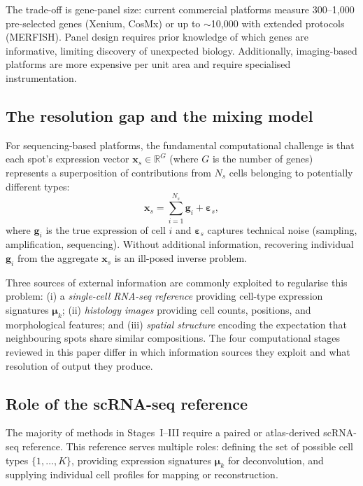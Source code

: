 The trade-off is gene-panel size: current commercial platforms measure 300--1{,}000 pre-selected genes (Xenium, CosMx) or up to $\sim$10{,}000 with extended protocols (MERFISH). Panel design requires prior knowledge of which genes are informative, limiting discovery of unexpected biology. Additionally, imaging-based platforms are more expensive per unit area and require specialised instrumentation.

\subsection{The resolution gap and the mixing model}

For sequencing-based platforms, the fundamental computational challenge is that each spot's expression vector $\mathbf{x}_s \in \mathbb{R}^G$ (where $G$ is the number of genes) represents a superposition of contributions from $N_s$ cells belonging to potentially different types:
\begin{equation}
  \mathbf{x}_s = \sum_{i=1}^{N_s} \mathbf{g}_i + \boldsymbol{\varepsilon}_s,
  \label{eq:mixing}
\end{equation}
where $\mathbf{g}_i$ is the true expression of cell $i$ and $\boldsymbol{\varepsilon}_s$ captures technical noise (sampling, amplification, sequencing). Without additional information, recovering individual $\mathbf{g}_i$ from the aggregate $\mathbf{x}_s$ is an ill-posed inverse problem.

Three sources of external information are commonly exploited to regularise this problem: (i) a \emph{single-cell RNA-seq reference} providing cell-type expression signatures $\boldsymbol{\mu}_k$; (ii) \emph{histology images} providing cell counts, positions, and morphological features; and (iii) \emph{spatial structure} encoding the expectation that neighbouring spots share similar compositions. The four computational stages reviewed in this paper differ in which information sources they exploit and what resolution of output they produce.

\subsection{Role of the scRNA-seq reference}

The majority of methods in Stages~I--III require a paired or atlas-derived scRNA-seq reference. This reference serves multiple roles: defining the set of possible cell types $\{1, \ldots, K\}$, providing expression signatures $\boldsymbol{\mu}_k$ for deconvolution, and supplying individual cell profiles for mapping or reconstruction.

